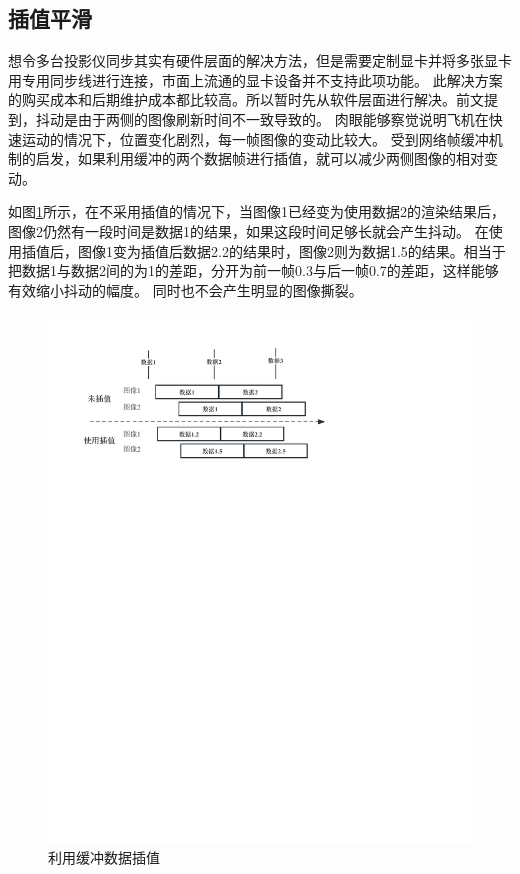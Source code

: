 \subsection{插值平滑}
想令多台投影仪同步其实有硬件层面的解决方法，但是需要定制显卡并将多张显卡用专用同步线进行连接，市面上流通的显卡设备并不支持此项功能。
此解决方案的购买成本和后期维护成本都比较高。所以暂时先从软件层面进行解决。前文提到，抖动是由于两侧的图像刷新时间不一致导致的。
肉眼能够察觉说明飞机在快速运动的情况下，位置变化剧烈，每一帧图像的变动比较大。
受到网络帧缓冲机制的启发，如果利用缓冲的两个数据帧进行插值，就可以减少两侧图像的相对变动。
\par 
如图\ref{lerp}所示，在不采用插值的情况下，当图像1已经变为使用数据2的渲染结果后，图像2仍然有一段时间是数据1的结果，如果这段时间足够长就会产生抖动。
在使用插值后，图像1变为插值后数据2.2的结果时，图像2则为数据1.5的结果。相当于把数据1与数据2间的为1的差距，分开为前一帧0.3与后一帧0.7的差距，这样能够有效缩小抖动的幅度。
同时也不会产生明显的图像撕裂。
\begin{figure}[h!]
    \begin{center}
        \includegraphics[width=\textwidth]{pictures/lerp.pdf}
        \caption{利用缓冲数据插值}
        \label{lerp}
    \end{center}
\end{figure}
